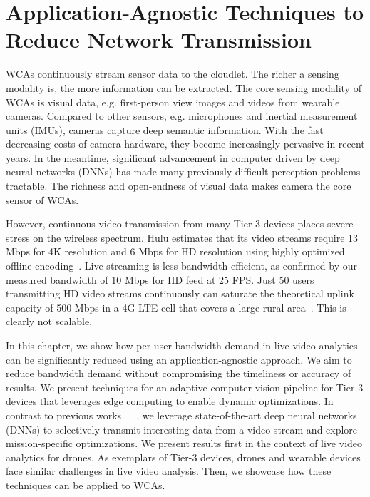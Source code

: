 \chapter{Application-Agnostic Techniques to Reduce Network Transmission}
\label{chapter: bandwidth}

WCAs continuously stream sensor data to the cloudlet. The richer a sensing
modality is, the more information can be extracted. The core sensing modality of
WCAs is visual data, e.g. first-person view images and videos from wearable
cameras. Compared to other sensors, e.g. microphones and inertial measurement
units (IMUs), cameras capture deep semantic information. With the fast
decreasing costs of camera hardware, they become increasingly pervasive in
recent years. In the meantime, significant advancement in computer driven by
deep neural networks (DNNs) has made many previously difficult perception
problems tractable. The richness and open-endness of visual data makes camera
the core sensor of WCAs.

However, continuous video transmission from many Tier-3 devices places severe
stress on the wireless spectrum.  Hulu estimates that its video streams require
13 Mbps for 4K resolution and 6 Mbps for HD resolution using highly optimized
offline encoding~\cite{Hulu2017}. Live streaming is less bandwidth-efficient, as
confirmed by our measured bandwidth of 10 Mbps for HD feed at 25 FPS. Just 50
users transmitting HD video streams continuously can saturate the theoretical
uplink capacity of 500 Mbps in a 4G LTE cell that covers a large rural
area~\cite{LteWorld2009}.  This is clearly not scalable.

In this chapter, we show how per-user bandwidth demand in live video analytics
can be significantly reduced using an application-agnostic approach. We aim to
reduce bandwidth demand without compromising the timeliness or accuracy of
results. We present techniques for an adaptive computer vision pipeline for
Tier-3 devices that leverages edge computing to enable dynamic optimizations. In
contrast to previous
works~\cite{Wang2017networked}~\cite{zhang2015design}~\cite{Wang2016skyeyes}, we
leverage state-of-the-art deep neural networks (DNNs) to selectively transmit
interesting data from a video stream and explore mission-specific optimizations.
We present results first in the context of live video analytics for drones. As
exemplars of Tier-3 devices, drones and wearable devices face similar challenges
in live video analysis. Then, we showcase how these techniques can be applied to
WCAs.





